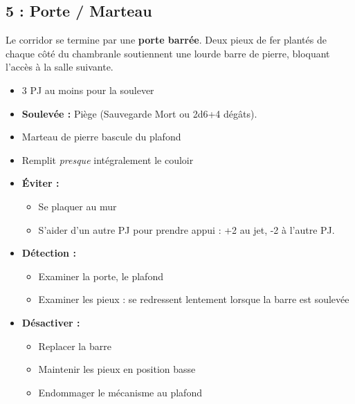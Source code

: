 
\subsection{5 : Porte / Marteau}\label{n1:s5}
Le corridor se termine par une \textbf{porte barrée}.
Deux pieux de fer plantés de chaque côté du chambranle soutiennent une lourde barre de pierre, bloquant l'accès à la salle suivante.

\begin{itemize}
  \item 3 PJ au moins pour la soulever
  \item \textbf{Soulevée :} Piège (Sauvegarde Mort ou 2d6+4 dégâts).
\end{itemize}

\begin{highlight}[Le piège]
  \vspace*{-\baselineskip}
  \begin{itemize}
    \item Marteau de pierre bascule du plafond
    \item Remplit \emph{presque} intégralement le couloir
    \item \textbf{\'Eviter :}
    \begin{itemize}
      \item Se plaquer au mur
      \item S'aider d'un autre PJ pour prendre appui : +2 au jet, -2 à l'autre PJ.
    \end{itemize}
    \item \textbf{Détection :}
    \begin{itemize}
      \item Examiner la porte, le plafond
      \item Examiner les pieux : se redressent lentement lorsque la barre est soulevée
    \end{itemize}
    \item \textbf{Désactiver :}
    \begin{itemize}
      \item Replacer la barre
      \item Maintenir les pieux en position basse
      \item Endommager le mécanisme au plafond
    \end{itemize}
  \end{itemize}
\end{highlight}


